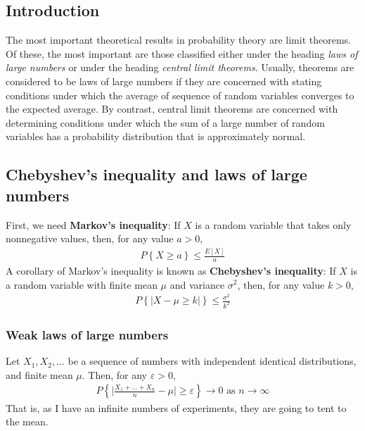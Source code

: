 \documentclass[a4paper]{article}
\begin{document}
\subsection{Introduction} %
\label{sub:Secon introduction}
The most important theoretical results in probability theory are limit theorems. Of these, the most important are those classified either under the heading \emph{laws of large numbers} or under the heading \emph{central limit theorems}. Usually, theorems are considered to be laws of large numbers if they are concerned with stating conditions under which the average of sequence of random variables converges to the expected average. By contrast, central limit theorems are concerned with determining conditions under which the sum of a large number of random variables has a probability distribution that is approximately normal.
\subsection{Chebyshev's inequality and laws of large numbers} %
\label{sub:Chebyshev's inequality and the weak law of large numbers}
First, we need {\bf Markov's inequality}: If $X$ is a random variable that takes only nonnegative values, then, for any value $a>0$,
\begin{align}
  P\left\{ X\geq a \right\} \leq \frac{E[X]}{a}
\end{align}
A corollary of Markov's inequality is known as {\bf Chebyshev's inequality}:
If $X$ is a random variable with finite mean $\mu$ and variance $\sigma^2$, then, for any value $k>0$,
\begin{align}
  P\left\{ |X-\mu\geq k| \right\} \leq \frac{\sigma^2}{k^2} 
\end{align}
\subsubsection{Weak laws of large numbers}
Let $X_1,X_2,\dots$ be a sequence of numbers with independent identical distributions, and finite mean $\mu$. Then, for any $\varepsilon>0$,
\begin{align}
  P\left\{ \Big|\frac{X_1+\dots+X_n}{n}-\mu\Big| \geq \varepsilon \right\} \rightarrow 0 \text{ as } n \rightarrow \infty
\end{align}
That is, as I have an infinite numbers of experiments, they are going to tent to the mean.
\end{document}
